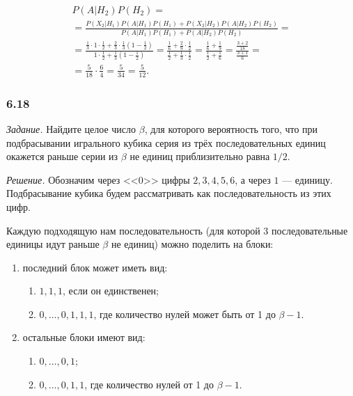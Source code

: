 \begin{enumerate}[label=\alph*)]
\begin{equation*}
\begin{split}
{P \left( \left. A \right| H_2 \right) P \left( H_2 \right) } = \\
= \frac{P \left( \left. X_2 \right| H_1 \right) P \left( \left. A \right| H_1 \right) P \left( H_1 \right) +
P \left( \left. X_2 \right| H_2 \right) P \left( \left. A \right| H_2 \right) P \left( H_2 \right)}{P \left( \left. A \right| H_1 \right) P \left( H_1 \right) +
P \left( \left. A \right| H_2 \right) P \left( H_2 \right) } = \\
= \frac{ \frac{1}{3} \cdot 1 \cdot \frac{1}{2} + \frac{2}{3} \cdot \frac{1}{3} \left( 1 - \frac{1}{2} \right) }{1 \cdot \frac{1}{2} +
\frac{1}{3} \left( 1 - \frac{1}{2} \right) } =
\frac{ \frac{1}{6} + \frac{2}{9} \cdot \frac{1}{2} }{ \frac{1}{2} + \frac{1}{3} \cdot \frac{1}{2} } =
\frac{ \frac{1}{6} + \frac{1}{9} }{ \frac{1}{2} + \frac{1}{6} } =
\frac{ \frac{3+2}{18} }{ \frac{3+1}{6} } = \\
= \frac{5}{18} \cdot \frac{6}{4} =
\frac{5}{34} =
\frac{5}{12}.
\end{split}
\end{equation*}
\end{enumerate}

\subsubsection*{6.18}

\textit{Задание.} Найдите целое число $ \beta $, для которого вероятность того, что при подбрасывании игрального кубика серия из трёх последовательных единиц окажется раньше серии из $ \beta $ не единиц приблизительно равна $1/2$.

\textit{Решение.} Обозначим через <<0>> цифры $2, 3, 4, 5, 6$, а через $1$ --- единицу.
Подбрасывание кубика будем рассматривать как последовательность из этих цифр.

Каждую подходящую нам последовательность (для которой 3 последовательные единицы идут раньше $ \beta $ не единиц) можно поделить на блоки:
\begin{enumerate}
\item последний блок может иметь вид:
\begin{enumerate}[label=\alph*)]
\item $1, 1, 1$, если он единственен;
\item $0, \dotsc, 0, 1, 1, 1$, где количество нулей может быть от 1 до $ \beta - 1$.
\end{enumerate}
\item остальные блоки имеют вид:
\begin{enumerate}[label=\alph*)]
\item $0, \dotsc, 0, 1$;
\item $0, \dotsc, 0, 1, 1$, где количество нулей от 1 до $ \beta - 1$.
\end{enumerate}
\end{enumerate}

